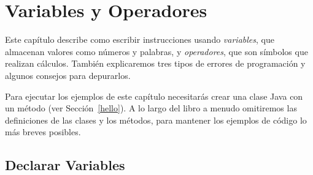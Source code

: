 \chapter{Variables y Operadores}
\label{variables}

Este capítulo describe como escribir instrucciones usando {\em variables}, que almacenan valores como números y palabras, y {\em operadores}, que son símbolos que realizan cálculos.
También explicaremos tres tipos de errores de programación y algunos consejos para depurarlos.

Para ejecutar los ejemplos de este capítulo necesitarás crear una clase Java con un método  (ver Sección~\ref{hello}).
A lo largo del libro a menudo omitiremos las definiciones de las clases y los métodos, para mantener los ejemplos de código lo más breves posibles.

\section{Declarar Variables}



